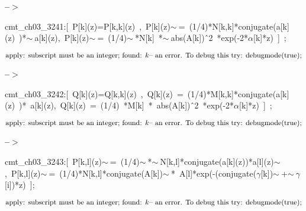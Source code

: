 \documentclass[fleqn]{article}
\begin{document}
\noindent
\begin{minipage}[t]{4.000000em}\color{red}\bfseries
 --\ensuremath{\ensuremath{>}}	
\end{minipage}
\begin{minipage}[t]{\textwidth}\color{blue}
cmt\_ch03\_3241:[\ P[k](z)=P[k,k](z)\ ,\ P[k](z)\ensuremath{\sim\ }=\ (1/4)*N[k,k]*conjugate(a[k](z)\ )*\ensuremath{\sim\ }a[k](z),\ P[k](z)\ensuremath{\sim\ }=\ (1/4)\ensuremath{\sim\ }*N[k]\ *\ensuremath{\sim\ }abs(A[k])\^\ 2\ *exp(-2*\ensuremath{\alpha}[k]*z)\ ]\ ;
\end{minipage}
\[\displaystyle \mbox{}\\\mbox{%
apply: subscript must be an integer; found: }k
\mbox{%
 -- an error. To debug this try: debugmode(true);}\mbox{}
\]


\noindent
\begin{minipage}[t]{4.000000em}\color{red}\bfseries
 --\ensuremath{\ensuremath{>}}	
\end{minipage}
\begin{minipage}[t]{\textwidth}\color{blue}
cmt\_ch03\_3242:[\ Q[k](z)=Q[k,k](z)\ ,\ Q[k](z)\ =\ (1/4)*M[k,k]*conjugate(a[k](z)\ )*\ a[k](z),\ Q[k](z)\ =\ (1/4)\ *M[k]\ *\ abs(A[k])\^\ 2\ *exp(-2*\ensuremath{\alpha}[k]*z)\ ]\ ;
\end{minipage}
\[\displaystyle \mbox{}\\\mbox{%
apply: subscript must be an integer; found: }k
\mbox{%
 -- an error. To debug this try: debugmode(true);}\mbox{}
\]


\noindent
\begin{minipage}[t]{4.000000em}\color{red}\bfseries
 --\ensuremath{\ensuremath{>}}	
\end{minipage}
\begin{minipage}[t]{\textwidth}\color{blue}
cmt\_ch03\_3243:[\ P[k,l](z)\ensuremath{\sim\ }=\ (1/4)\ensuremath{\sim\ }*\ensuremath{\sim\ }N[k,l]*conjugate(a[k](z))*a[l](z)\ensuremath{\sim\ },\ P[k,l](z)\ensuremath{\sim\ }=\ (1/4)*N[k,l]*conjugate(A[k])\ensuremath{\sim\ }*\ A[l]*exp(-(conjugate(\ensuremath{\gamma}[k])\ensuremath{\sim\ }+\ensuremath{\sim\ }\ensuremath{\gamma}[i])*z)\ ];
\end{minipage}
\[\displaystyle \mbox{}\\\mbox{%
apply: subscript must be an integer; found: }k
\mbox{%
 -- an error. To debug this try: debugmode(true);}\mbox{}
\]
\end{document}
